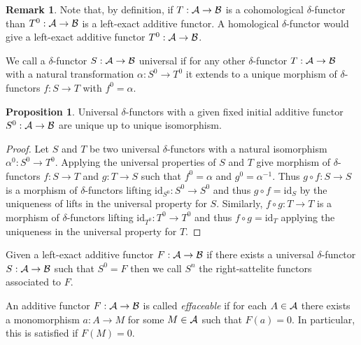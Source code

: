 \documentclass[12pt]{extarticle}
\newcommand{\id}{\mathrm{id}}
\theoremstyle{definition}
\newtheorem{proposition}[theorem]{Proposition}
\newtheorem{remark}{Remark}
\newenvironment{definition}[1][Definition:]{\begin{trivlist}
\item[\hskip \labelsep {\bfseries #1}]}{\end{trivlist}}
\begin{document}
\begin{remark}
Note that, by definition, if $T : \mathcal{A} \to \mathcal{B}$ is a cohomological $\delta$-functor than $T^0 : \mathcal{A} \to \mathcal{B}$ is a left-exact additive functor. A homological $\delta$-functor would give a left-exact additive functor $T^0 : \mathcal{A} \to \mathcal{B}$.
\end{remark}

\begin{definition}
We call a $\delta$-functor $S : \mathcal{A} \to \mathcal{B}$ universal if for any other $\delta$-functor $T : \mathcal{A} \to \mathcal{B}$ with a natural transformation $\alpha : S^0 \to T^0$ it extends to a unique morphism of $\delta$-functors $f : S \to T$ with $f^0 = \alpha$.
\end{definition}

\begin{proposition}
Universal $\delta$-functors with a given fixed initial additive functor $S^0 : \mathcal{A} \to \mathcal{B}$ are unique up to unique isomorphism. 
\end{proposition}

\begin{proof}
Let $S$ and $T$ be two universal $\delta$-functors with a natural isomorphism $\alpha^0 : S^0 \to T^0$. Applying the universal properties of $S$ and $T$ give morphism of $\delta$-functors $f : S \to T$ and $g : T \to S$ such that $f^0 = \alpha$ and $g^0 = \alpha^{-1}$. Thus $g \circ f : S \to S$ is a morphism of $\delta$-functors lifting $\id_{S^0} : S^0 \to S^0$ and thus $g \circ f = \id_S$ by the uniqueness of lifts in the universal property for $S$. Similarly, $f \circ g : T \to T$ is a morphism of $\delta$-functors lifting $\id_{T^0} : T^0 \to T^0$ and thus $f \circ g = \id_{T}$ applying the uniqueness in the universal property for $T$.  
\end{proof}

\begin{definition}
Given a left-exact additive functor $F : \mathcal{A} \to \mathcal{B}$ if there exists a universal $\delta$-functor $S : \mathcal{A} \to \mathcal{B}$ such that $S^0 = F$ then we call $S^n$ the right-sattelite functors associated to $F$. 
\end{definition}

\begin{definition}
An additive functor $F : \mathcal{A} \to \mathcal{B}$ is called \textit{effaceable} if for each $A \in \mathcal{A}$ there exists a monomorphism $a : A \to M$ for some $M \in \mathcal{A}$ such that $F(a) = 0$. In particular, this is satisfied if $F(M) = 0$. 
\end{definition}
\end{document}
